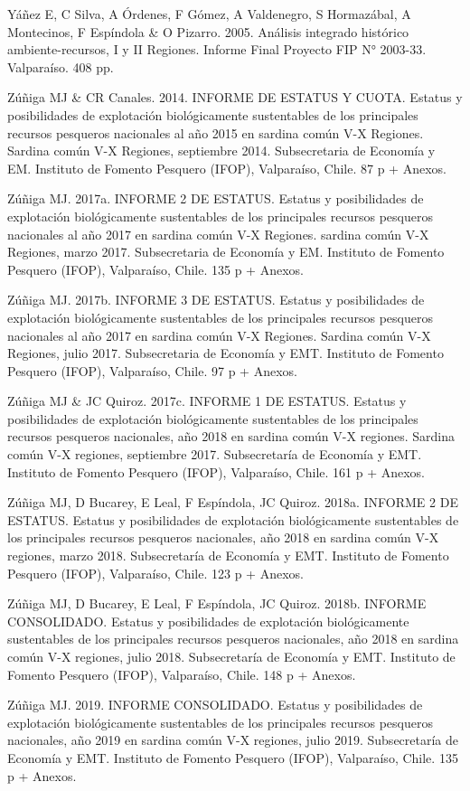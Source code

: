 \documentclass[
  spanish,
]{article}
\begin{document}
Yáñez E, C Silva, A Órdenes, F Gómez, A Valdenegro, S Hormazábal, A
Montecinos, F Espíndola \& O Pizarro. 2005. Análisis integrado histórico
ambiente-recursos, I y II Regiones. Informe Final Proyecto FIP N°
2003-33. Valparaíso. 408 pp.

Zúñiga MJ \& CR Canales. 2014. INFORME DE ESTATUS Y CUOTA. Estatus y
posibilidades de explotación biológicamente sustentables de los
principales recursos pesqueros nacionales al año 2015 en sardina común
V-X Regiones. Sardina común V-X Regiones, septiembre 2014. Subsecretaria
de Economía y EM. Instituto de Fomento Pesquero (IFOP), Valparaíso,
Chile. 87 p + Anexos.

Zúñiga MJ. 2017a. INFORME 2 DE ESTATUS. Estatus y posibilidades de
explotación biológicamente sustentables de los principales recursos
pesqueros nacionales al año 2017 en sardina común V-X Regiones. sardina
común V-X Regiones, marzo 2017. Subsecretaria de Economía y EM.
Instituto de Fomento Pesquero (IFOP), Valparaíso, Chile. 135 p + Anexos.

Zúñiga MJ. 2017b. INFORME 3 DE ESTATUS. Estatus y posibilidades de
explotación biológicamente sustentables de los principales recursos
pesqueros nacionales al año 2017 en sardina común V-X Regiones. Sardina
común V-X Regiones, julio 2017. Subsecretaria de Economía y EMT.
Instituto de Fomento Pesquero (IFOP), Valparaíso, Chile. 97 p + Anexos.

Zúñiga MJ \& JC Quiroz. 2017c. INFORME 1 DE ESTATUS. Estatus y
posibilidades de explotación biológicamente sustentables de los
principales recursos pesqueros nacionales, año 2018 en sardina común V-X
regiones. Sardina común V-X regiones, septiembre 2017. Subsecretaría de
Economía y EMT. Instituto de Fomento Pesquero (IFOP), Valparaíso, Chile.
161 p + Anexos.

Zúñiga MJ, D Bucarey, E Leal, F Espíndola, JC Quiroz. 2018a. INFORME 2
DE ESTATUS. Estatus y posibilidades de explotación biológicamente
sustentables de los principales recursos pesqueros nacionales, año 2018
en sardina común V-X regiones, marzo 2018. Subsecretaría de Economía y
EMT. Instituto de Fomento Pesquero (IFOP), Valparaíso, Chile. 123 p +
Anexos.

Zúñiga MJ, D Bucarey, E Leal, F Espíndola, JC Quiroz. 2018b. INFORME
CONSOLIDADO. Estatus y posibilidades de explotación biológicamente
sustentables de los principales recursos pesqueros nacionales, año 2018
en sardina común V-X regiones, julio 2018. Subsecretaría de Economía y
EMT. Instituto de Fomento Pesquero (IFOP), Valparaíso, Chile. 148 p +
Anexos.

Zúñiga MJ. 2019. INFORME CONSOLIDADO. Estatus y posibilidades de
explotación biológicamente sustentables de los principales recursos
pesqueros nacionales, año 2019 en sardina común V-X regiones, julio
2019. Subsecretaría de Economía y EMT. Instituto de Fomento Pesquero
(IFOP), Valparaíso, Chile. 135 p + Anexos.
\end{document}
